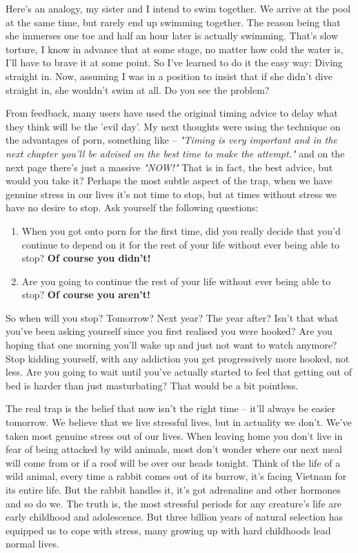 \documentclass[easypeasy.tex]{subfiles}
\begin{document}
Here's an analogy, my sister and I intend to swim together. We arrive at the pool at the same time, but rarely end up swimming together. The reason being that she immerses one toe and half an hour later is actually swimming. That's slow torture, I know in advance that at some stage, no matter how cold the water is, I'll have to brave it at some point. So I've learned to do it the easy way: Diving straight in. Now, assuming I was in a position to insist that if she didn't dive straight in, she wouldn't swim at all. Do you see the problem?

From feedback, many users have used the original timing advice to delay what they think will be the 'evil day'. My next thoughts were using the technique on the advantages of porn, something like -- \textit{"Timing is very important and in the next chapter you'll be advised on the best time to make the attempt."} and on the next page there's just a massive \textit{"NOW!"} That is in fact, the best advice, but would you take it? Perhaps the most subtle aspect of the trap, when we have genuine stress in our lives it's not time to stop, but at times without stress we have no desire to stop. Ask yourself the following questions: 

\begin{enumerate}
  \item When you got onto porn for the first time, did you really decide that you'd continue to depend on it for the rest of your life without ever being able to stop? \textbf{Of course you didn't!}

  \item Are you going to continue the rest of your life without ever being able to stop? \textbf{Of course you aren't!}
  \end{enumerate}

So when will you stop? Tomorrow? Next year? The year after? Isn't that what you've been asking yourself since you first realised you were hooked? Are you hoping that one morning you'll wake up and just not want to watch anymore? Stop kidding yourself, with any addiction you get progressively more hooked, not less. Are you going to wait until you've actually started to feel that getting out of bed is harder than just masturbating? That would be a bit pointless.

The real trap is the belief that now isn't the right time -- it'll always be easier tomorrow. We believe that we live stressful lives, but in actuality we don't. We've taken most genuine stress out of our lives. When leaving home you don't live in fear of being attacked by wild animals, most don't wonder where our next meal will come from or if a roof will be over our heads tonight. Think of the life of a wild animal, every time a rabbit comes out of its burrow, it's facing Vietnam for its entire life. But the rabbit handles it, it's got adrenaline and other hormones and so do we. The truth is, the most stressful periods for any creature's life are early childhood and adolescence. But three billion years of natural selection has equipped us to cope with stress, many growing up with hard childhoods lead normal lives.
\end{document}
